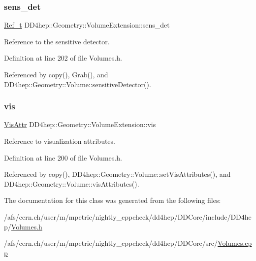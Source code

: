 \subsubsection{\texorpdfstring{sens\+\_\+det}{sens\_det}}
{\footnotesize\ttfamily \hyperlink{group___d_d4_h_e_p___g_e_o_m_e_t_r_y_ga40af83be6718bb8828a3d83dc7f8c930}{Ref\+\_\+t} D\+D4hep\+::\+Geometry\+::\+Volume\+Extension\+::sens\+\_\+det}



Reference to the sensitive detector. 



Definition at line 202 of file Volumes.\+h.



Referenced by copy(), Grab(), and D\+D4hep\+::\+Geometry\+::\+Volume\+::sensitive\+Detector().

\hypertarget{class_d_d4hep_1_1_geometry_1_1_volume_extension_ae4a19cb963f258f84a6fa871e8b6f4c1}{}\label{class_d_d4hep_1_1_geometry_1_1_volume_extension_ae4a19cb963f258f84a6fa871e8b6f4c1} 
\subsubsection{\texorpdfstring{vis}{vis}}
{\footnotesize\ttfamily \hyperlink{class_d_d4hep_1_1_geometry_1_1_vis_attr}{Vis\+Attr} D\+D4hep\+::\+Geometry\+::\+Volume\+Extension\+::vis}



Reference to visualization attributes. 



Definition at line 200 of file Volumes.\+h.



Referenced by copy(), D\+D4hep\+::\+Geometry\+::\+Volume\+::set\+Vis\+Attributes(), and D\+D4hep\+::\+Geometry\+::\+Volume\+::vis\+Attributes().



The documentation for this class was generated from the following files\+:\begin{DoxyCompactItemize}
\item 
/afs/cern.\+ch/user/m/mpetric/nightly\+\_\+cppcheck/dd4hep/\+D\+D\+Core/include/\+D\+D4hep/\hyperlink{_volumes_8h}{Volumes.\+h}\item 
/afs/cern.\+ch/user/m/mpetric/nightly\+\_\+cppcheck/dd4hep/\+D\+D\+Core/src/\hyperlink{_volumes_8cpp}{Volumes.\+cpp}\end{DoxyCompactItemize}
